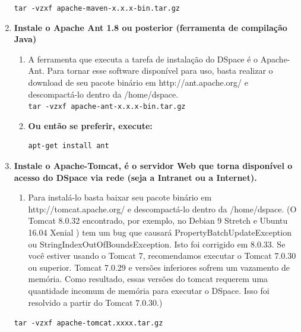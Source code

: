 \documentclass[12pt,hidelinks]{article}
\begin{document}
\begin{enumerate}
            \texttt{tar -vzxf apache-maven-x.x.x-bin.tar.gz}\\
        
        
    \item \textbf{ Instale o Apache Ant 1.8 ou posterior (ferramenta de compilação Java)}\\
         \begin{enumerate}
            \item A ferramenta que executa a tarefa de instalação do DSpace é o Apache-Ant. Para tornar esse software disponível para uso, basta realizar o download de seu pacote binário em http://ant.apache.org/ e descompactá-lo dentro da /home/dspace.\\
            
                \texttt{tar -vzxf apache-ant-x.x.x-bin.tar.gz}\\
            
            \item \textbf{Ou então se preferir, execute:}\\
                \begin{verbatim}
apt-get install ant
                \end{verbatim}
            
        \end{enumerate}
        
        \item \textbf{Instale o Apache-Tomcat, é o servidor Web que torna disponível o acesso do DSpace via rede (seja a Intranet ou a Internet).} \\
    
        
        \begin{enumerate}
            \item Para instalá-lo basta baixar seu pacote binário em http://tomcat.apache.org/ e descompactá-lo dentro da /home/dspace. (O Tomcat 8.0.32 encontrado, por exemplo, no Debian 9 Stretch e Ubuntu 16.04 Xenial ) tem um bug que causará PropertyBatchUpdateException ou StringIndexOutOfBoundsException.   Isto foi corrigido em 8.0.33. Se você estiver usando o Tomcat 7, recomendamos executar o Tomcat 7.0.30 ou superior. Tomcat 7.0.29 e versões inferiores sofrem um vazamento de memória. Como resultado, essas versões do tomcat requerem uma quantidade incomum de memória para executar o DSpace. Isso foi resolvido a partir do Tomcat 7.0.30.)
        \end{enumerate}
        
                \texttt{tar -vzxf apache-tomcat.xxxx.tar.gz} \\
        

\end{enumerate}
\end{document}
